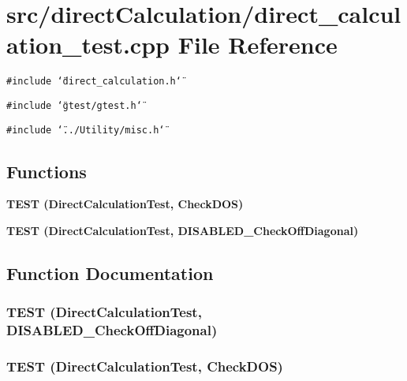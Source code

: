 \section{src/direct\-Calculation/direct\_\-calculation\_\-test.cpp File Reference}
\label{direct__calculation__test_8cpp}
{\tt \#include \char`\"{}direct\_\-calculation.h\char`\"{}}\par
{\tt \#include \char`\"{}gtest/gtest.h\char`\"{}}\par
{\tt \#include \char`\"{}../Utility/misc.h\char`\"{}}\par
\subsection*{Functions}
\begin{CompactItemize}
\item 
\bf{TEST} (Direct\-Calculation\-Test, Check\-DOS)
\item 
\bf{TEST} (Direct\-Calculation\-Test, DISABLED\_\-Check\-Off\-Diagonal)
\end{CompactItemize}


\subsection{Function Documentation}
\subsubsection{\setlength{\rightskip}{0pt plus 5cm}TEST (Direct\-Calculation\-Test, DISABLED\_\-Check\-Off\-Diagonal)}\label{direct__calculation__test_8cpp_14e49cca22d8a154c946c0059a0d29c8}


\subsubsection{\setlength{\rightskip}{0pt plus 5cm}TEST (Direct\-Calculation\-Test, Check\-DOS)}\label{direct__calculation__test_8cpp_4ef2c0f97d068d01cd4b012b5a129d42}


